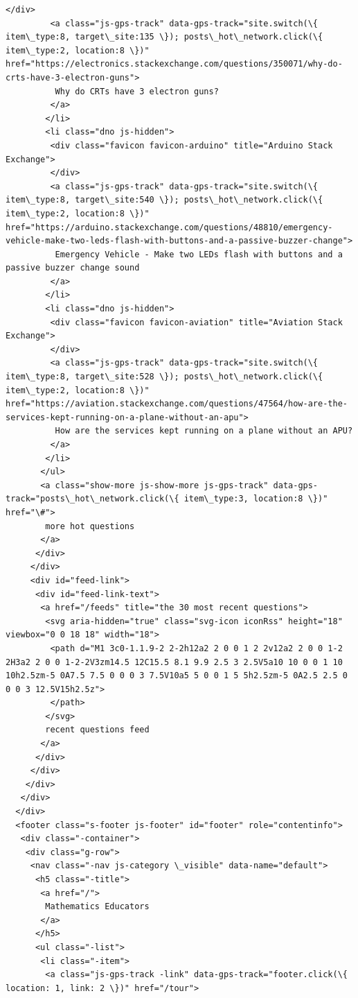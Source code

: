 \documentclass[11pt]{article}
\begin{document}
\begin{Verbatim}[commandchars=\\\{\}]
         </div>
         <a class="js-gps-track" data-gps-track="site.switch(\{ item\_type:8, target\_site:135 \}); posts\_hot\_network.click(\{ item\_type:2, location:8 \})" href="https://electronics.stackexchange.com/questions/350071/why-do-crts-have-3-electron-guns">
          Why do CRTs have 3 electron guns?
         </a>
        </li>
        <li class="dno js-hidden">
         <div class="favicon favicon-arduino" title="Arduino Stack Exchange">
         </div>
         <a class="js-gps-track" data-gps-track="site.switch(\{ item\_type:8, target\_site:540 \}); posts\_hot\_network.click(\{ item\_type:2, location:8 \})" href="https://arduino.stackexchange.com/questions/48810/emergency-vehicle-make-two-leds-flash-with-buttons-and-a-passive-buzzer-change">
          Emergency Vehicle - Make two LEDs flash with buttons and a passive buzzer change sound
         </a>
        </li>
        <li class="dno js-hidden">
         <div class="favicon favicon-aviation" title="Aviation Stack Exchange">
         </div>
         <a class="js-gps-track" data-gps-track="site.switch(\{ item\_type:8, target\_site:528 \}); posts\_hot\_network.click(\{ item\_type:2, location:8 \})" href="https://aviation.stackexchange.com/questions/47564/how-are-the-services-kept-running-on-a-plane-without-an-apu">
          How are the services kept running on a plane without an APU?
         </a>
        </li>
       </ul>
       <a class="show-more js-show-more js-gps-track" data-gps-track="posts\_hot\_network.click(\{ item\_type:3, location:8 \})" href="\#">
        more hot questions
       </a>
      </div>
     </div>
     <div id="feed-link">
      <div id="feed-link-text">
       <a href="/feeds" title="the 30 most recent questions">
        <svg aria-hidden="true" class="svg-icon iconRss" height="18" viewbox="0 0 18 18" width="18">
         <path d="M1 3c0-1.1.9-2 2-2h12a2 2 0 0 1 2 2v12a2 2 0 0 1-2 2H3a2 2 0 0 1-2-2V3zm14.5 12C15.5 8.1 9.9 2.5 3 2.5V5a10 10 0 0 1 10 10h2.5zm-5 0A7.5 7.5 0 0 0 3 7.5V10a5 5 0 0 1 5 5h2.5zm-5 0A2.5 2.5 0 0 0 3 12.5V15h2.5z">
         </path>
        </svg>
        recent questions feed
       </a>
      </div>
     </div>
    </div>
   </div>
  </div>
  <footer class="s-footer js-footer" id="footer" role="contentinfo">
   <div class="-container">
    <div class="g-row">
     <nav class="-nav js-category \_visible" data-name="default">
      <h5 class="-title">
       <a href="/">
        Mathematics Educators
       </a>
      </h5>
      <ul class="-list">
       <li class="-item">
        <a class="js-gps-track -link" data-gps-track="footer.click(\{ location: 1, link: 2 \})" href="/tour">

\end{Verbatim}
\end{document}

